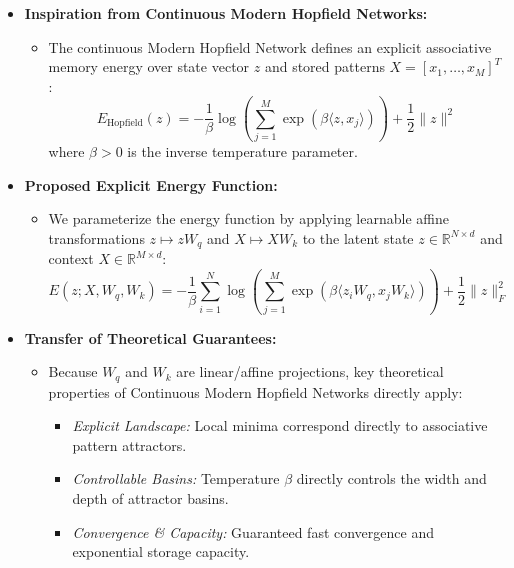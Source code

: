 \documentclass[11pt,a4paper]{article}
\begin{document}
\begin{itemize}[leftmargin=1.5em]
    \item \textbf{Inspiration from Continuous Modern Hopfield Networks:}
    \begin{itemize}[leftmargin=1.2em]
        \item The continuous Modern Hopfield Network defines an explicit associative memory energy over state vector $z$ and stored patterns $X = [x_1, \dots, x_M]^T$:
        \begin{equation}
            E_{\text{Hopfield}}(z) = -\frac{1}{\beta} \log \left( \sum_{j=1}^M \exp(\beta \langle z, x_j \rangle) \right) + \frac{1}{2} \|z\|^2
        \end{equation}
        where $\beta > 0$ is the inverse temperature parameter.
    \end{itemize}

    \item \textbf{Proposed Explicit Energy Function:}
    \begin{itemize}[leftmargin=1.2em]
        \item We parameterize the energy function by applying learnable affine transformations $z \mapsto z W_q$ and $X \mapsto X W_k$ to the latent state $z \in \mathbb{R}^{N \times d}$ and context $X \in \mathbb{R}^{M \times d}$:
        \begin{equation}
            E(z; X, W_q, W_k) = -\frac{1}{\beta} \sum_{i=1}^N \log \left( \sum_{j=1}^M \exp\left( \beta \langle z_i W_q, x_j W_k \rangle \right) \right) + \frac{1}{2} \|z\|_F^2
        \end{equation}
    \end{itemize}

    \item \textbf{Transfer of Theoretical Guarantees:}
    \begin{itemize}[leftmargin=1.2em]
        \item Because $W_q$ and $W_k$ are linear/affine projections, key theoretical properties of Continuous Modern Hopfield Networks directly apply:
        \begin{itemize}[leftmargin=1.2em]
            \item \textit{Explicit Landscape:} Local minima correspond directly to associative pattern attractors.
            \item \textit{Controllable Basins:} Temperature $\beta$ directly controls the width and depth of attractor basins.
            \item \textit{Convergence \& Capacity:} Guaranteed fast convergence and exponential storage capacity.
        \end{itemize}
    \end{itemize}


\end{itemize}
\end{document}

